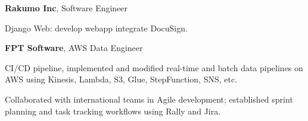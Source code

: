 


\begin{twocolentry}{
	}
	\textbf{Rakumo Inc}, Software Engineer
	\begin{highlights}
		\item Django Web: develop webapp integrate DocuSign.
	\end{highlights}
\end{twocolentry}

\begin{twocolentry}{
	}
	\textbf{FPT Software}, AWS Data Engineer
	
	\begin{highlights}
		\item CI/CD pipeline, implemented and modified real-time and batch data pipelines on AWS using Kinesis, Lambda, S3, Glue, StepFunction, SNS, etc.
		\item Collaborated with international teams in Agile development; established sprint planning and task tracking workflows using Rally and Jira.
		
		
	\end{highlights}
	
	
\end{twocolentry}

